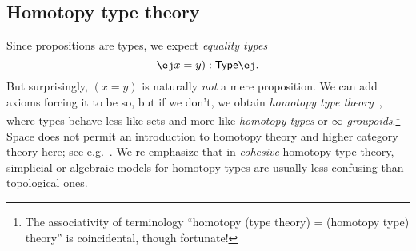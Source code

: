 \documentclass[copyright,12pt]{eptcs}
\makeatletter
\newcommand{\type}{\ensuremath{\mathsf{Type}}\xspace}
\def\jd#1{\@jd#1\ej}
\def\@jd#1|-#2\ej{\@@jd#1,,\;\vdash\;\left(#2\right)}
\def\@@jd#1,{\@ifmtarg{#1}{\let\next=\relax}{\left(#1\right)\let\next=\@@@jd}\next}
\def\@@@jd#1,{\@ifmtarg{#1}{\let\next=\relax}{,\,\left(#1\right)\let\next=\@@@jd}\next}
\makeatother
\begin{document}
\subsection{Homotopy type theory}
\label{sec:hott}

Since propositions are types, we expect \emph{equality types}
\[\jd{x:A,y:A|- (x=y):\type}.\]
But surprisingly, $(x=y)$ is naturally \emph{not} a mere proposition. %
We can add axioms forcing it to be so, but if we don't, we obtain \emph{homotopy type theory}~\cite{hottbook}, where types behave less like sets and more like \emph{homotopy types} or \emph{$\infty$-groupoids}.\footnote{The associativity of terminology ``homotopy (type theory) = (homotopy type) theory'' is coincidental, though fortunate!}
Space does not permit an introduction to homotopy theory and higher category theory here; see e.g.~\cite[\S1.1]{LurieHTT}.
We re-emphasize that in \emph{cohesive} homotopy type theory, simplicial or algebraic models for homotopy types are usually less confusing than topological ones.



\end{document}
